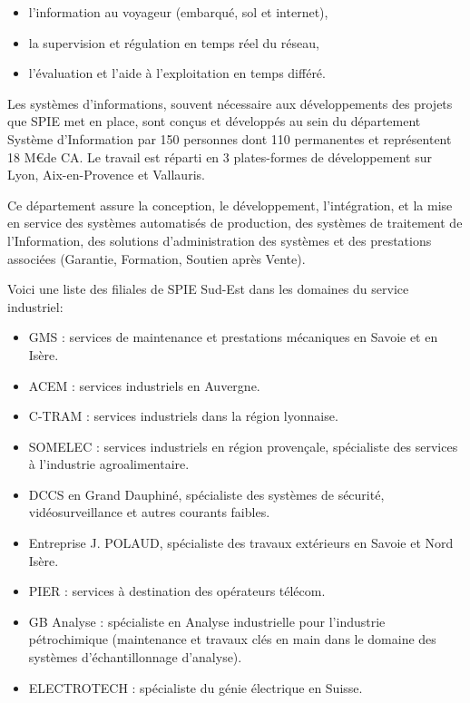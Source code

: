 \begin{itemize}
\item l’information au voyageur (embarqué, sol et internet),
\item la supervision et régulation en temps réel du réseau,
\item l’évaluation et l'aide à l’exploitation en temps différé.
\end{itemize}

Les systèmes d’informations, souvent nécessaire aux développements des projets que SPIE met en place, sont conçus et développés au sein du département Système d’Information par 150 personnes dont 110 permanentes et représentent 18 M\euro de CA. Le travail est réparti en 3 plates-formes de développement sur Lyon, Aix-en-Provence et Vallauris.

Ce département assure la conception, le développement, l’intégration, et la mise en service des systèmes automatisés de production, des systèmes de traitement de l’Information, des solutions d’administration des systèmes et des prestations associées (Garantie, Formation, Soutien après Vente).\footnotemark


Voici une liste des filiales de SPIE Sud-Est dans les domaines du service industriel\footnotemark :

\begin{itemize}
\item GMS : services de maintenance et prestations mécaniques en Savoie et en Isère.
\item ACEM : services industriels en Auvergne.
\item C-TRAM : services industriels dans la région lyonnaise.
\item SOMELEC : services industriels en région provençale, spécialiste des services à l’industrie agroalimentaire.
\item DCCS en Grand Dauphiné, spécialiste des systèmes de sécurité, vidéosurveillance et autres courants faibles.
\item Entreprise J. POLAUD, spécialiste des travaux extérieurs en Savoie et Nord Isère.
\item PIER : services à destination des opérateurs télécom.
\item GB Analyse : spécialiste en Analyse industrielle pour l’industrie pétrochimique (maintenance et travaux clés en main dans le domaine des systèmes d’échantillonnage d’analyse).
\item ELECTROTECH : spécialiste du génie électrique en Suisse.
\end{itemize}

